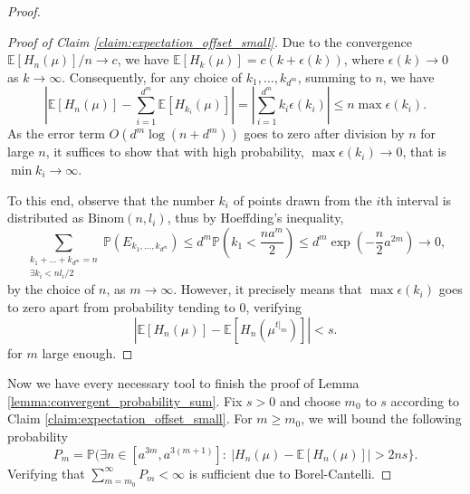 \documentclass[11pt]{article}
\newcommand{\PP}{\mathbb{P}}
\newcommand{\EE}{\mathbb{E}}
\newcommand{\Binom}{\mathrm{Binom}}
\theoremstyle{definition}
\begin{document}
\begin{proof}
\begin{proof}[Proof of Claim \ref{claim:expectation_offset_small}]
    Due to the convergence $\EE [H_n(\mu)] /n\to c$, we have $\EE [H_{k}(\mu)] = c(k+\epsilon(k))$, where $\epsilon(k)\to 0$ as $k\to \infty$. Consequently, for any choice of $k_1, \dots, k_{d^m}$, summing to $n$, we have
    $$\left|\EE [H_n(\mu)] -\sum_{i=1}^{d^m}\EE [H_{k_i}(\mu)]\right|=\left|\sum_{i=1}^{d^m}k_i \epsilon(k_i)\right|\leq n\max \epsilon(k_i).$$
    As the error term $O(d^m\log(n+d^m))$ goes to zero after division by $n$ for large $n$, it suffices to show that with high probability, $\max \epsilon(k_i)\to 0$, that is $\min k_i \to \infty$.
    
    To this end, observe that the number $k_i$ of points drawn from the $i$th interval is distributed as $\Binom(n, l_i)$, thus by Hoeffding's inequality,
    $$\sum_{\substack{k_1+\dots+k_{d^m}=n \\ \exists k_i<nl_i/2}} \PP(E_{k_1, \dots, k_{d^m}})\leq d^m \PP\left(k_1<\frac{na^m}{2}\right)\leq d^m\exp\left(-\frac{n}{2}a^{2m}\right)\to 0,$$
    by the choice of $n$, as $m\to \infty$. However, it precisely means that $\max \epsilon(k_i)$ goes to zero apart from probability tending to 0, verifying
    $$|\EE [H_n(\mu)] - \EE [H_n(\mu^{t|_m})]|<s.$$
    for $m$ large enough.
\end{proof}

Now we have every necessary tool to finish the proof of Lemma   \ref{lemma:convergent_probability_sum}.
    Fix $s>0$ and choose $m_0$ to $s$ according to Claim \ref{claim:expectation_offset_small}. For $m\geq m_0$, we will bound the following probability
    $$P_m = \PP(\exists n\in [a^{3m}, a^{3(m+1)}]:\ |H_n(\mu) - \EE [H_n(\mu)]| >2ns\}.$$
    Verifying that $\sum_{m=m_0}^{\infty}P_m<\infty$ is sufficient due to Borel-Cantelli.
    

\end{proof}
\end{document}

